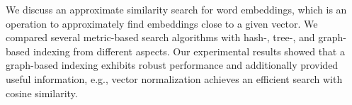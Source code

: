 We discuss an approximate similarity search for word embeddings, which is an operation to approximately find embeddings close to a given vector. We compared several metric-based search algorithms with hash-, tree-, and graph-based indexing from different aspects. Our experimental results showed that a graph-based indexing exhibits robust performance and additionally provided useful information, e.g., vector normalization achieves an efficient search with cosine similarity.

